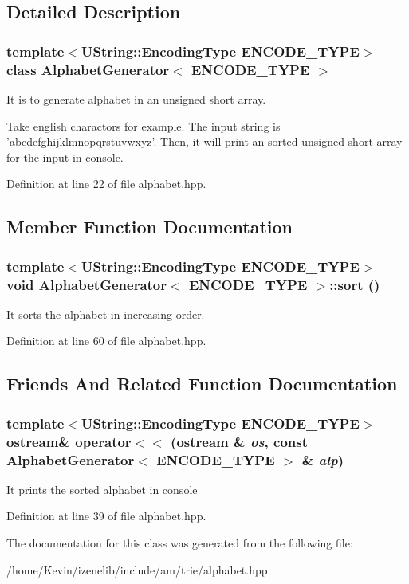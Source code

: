 \subsection{Detailed Description}
\subsubsection*{template$<$UString::EncodingType ENCODE\_\-TYPE$>$ class AlphabetGenerator$<$ ENCODE\_\-TYPE $>$}

It is to generate alphabet in an unsigned short array. 

Take english charactors for example. The input string is 'abcdefghijklmnopqrstuvwxyz'. Then, it will print an sorted unsigned short array for the input in console. 

Definition at line 22 of file alphabet.hpp.

\subsection{Member Function Documentation}
\hypertarget{classAlphabetGenerator_043cc2c724f3a9bbb6bc2e2fa08eb9e0}{
\subsubsection[{sort}]{\setlength{\rightskip}{0pt plus 5cm}template$<$UString::EncodingType ENCODE\_\-TYPE$>$ void {\bf AlphabetGenerator}$<$ ENCODE\_\-TYPE $>$::sort ()}}
\label{classAlphabetGenerator_043cc2c724f3a9bbb6bc2e2fa08eb9e0}


It sorts the alphabet in increasing order. 

Definition at line 60 of file alphabet.hpp.

\subsection{Friends And Related Function Documentation}
\hypertarget{classAlphabetGenerator_31333380ab17eefe3011a767aafbcbbb}{
\subsubsection[{operator$<$$<$}]{\setlength{\rightskip}{0pt plus 5cm}template$<$UString::EncodingType ENCODE\_\-TYPE$>$ ostream\& operator$<$$<$ (ostream \& {\em os}, \/  const {\bf AlphabetGenerator}$<$ ENCODE\_\-TYPE $>$ \& {\em alp})}}
\label{classAlphabetGenerator_31333380ab17eefe3011a767aafbcbbb}


It prints the sorted alphabet in console 

Definition at line 39 of file alphabet.hpp.

The documentation for this class was generated from the following file:\begin{CompactItemize}
\item 
/home/Kevin/izenelib/include/am/trie/alphabet.hpp\end{CompactItemize}
